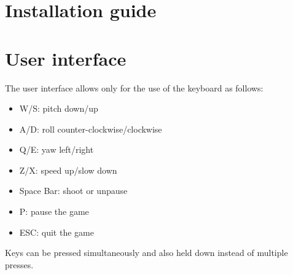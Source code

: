 \section{Installation guide}

\section{User interface}
The user interface allows only for the use of the keyboard as follows:
\begin{itemize}
\item W/S: pitch down/up
\item A/D: roll counter-clockwise/clockwise 
\item Q/E: yaw left/right
\item Z/X: speed up/slow down
\item Space Bar: shoot or unpause
\item P: pause the game
\item ESC: quit the game
\end{itemize}
Keys can be pressed simultaneously and also held down instead of multiple presses.


